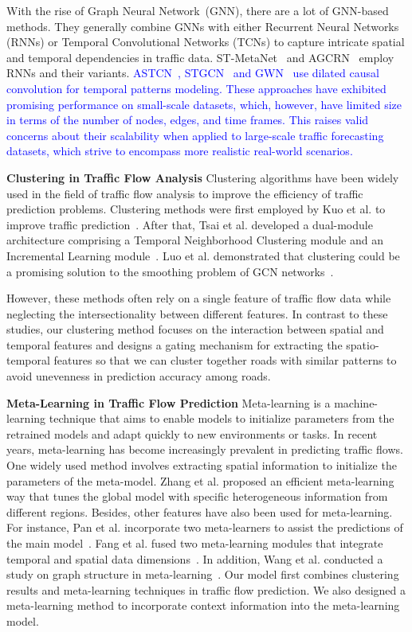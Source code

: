 \documentclass[lettersize,journal]{IEEEtran}
\begin{document}
With the rise of Graph Neural Network~(GNN), there are a lot of GNN-based methods. They generally combine GNNs with either Recurrent Neural Networks (RNNs) or Temporal Convolutional Networks (TCNs) to capture intricate spatial and temporal dependencies in traffic data. ST-MetaNet~\cite{pan_urban_2019} and AGCRN~\cite{10.5555/3495724.3497218} employ RNNs and their variants. \textcolor{blue}{ASTCN~\cite{DBLP:conf/icdm/Zhang0SG021}, STGCN~\cite{stgcn} and GWN~\cite{graphwave} use dilated causal convolution for temporal patterns modeling. These approaches have exhibited promising performance on small-scale datasets, which, however, have limited size in terms of the number of nodes, edges, and time frames. This raises valid concerns about their scalability when applied to large-scale traffic forecasting datasets, which strive to encompass more realistic real-world scenarios.}

\textbf{Clustering in Traffic Flow Analysis}
Clustering algorithms have been widely used in the field of traffic flow analysis to improve the efficiency of traffic prediction problems. Clustering methods were first employed by Kuo et al. to improve traffic prediction~\cite{kuo_adaptive_2001}. After that, Tsai et al. developed a dual-module architecture comprising a Temporal Neighborhood Clustering module and an Incremental Learning module~\cite{tsai_incremental_2022}. Luo et al. demonstrated that clustering could be a promising solution to the smoothing problem of GCN networks~\cite{luo_clusterst_2023}.

However, these methods often rely on a single feature of traffic flow data while neglecting the intersectionality between different features. In contrast to these studies, our clustering method focuses on the interaction between spatial and temporal features and designs a gating mechanism for extracting the spatio-temporal features so that we can cluster together roads with similar patterns to avoid unevenness in prediction accuracy among roads.

\textbf{Meta-Learning in Traffic Flow Prediction}
Meta-learning is a machine-learning technique that aims to enable models to initialize parameters from the retrained models and adapt quickly to new environments or tasks. In recent years, meta-learning has become increasingly prevalent in predicting traffic flows. One widely used method involves extracting spatial information to initialize the parameters of the meta-model. Zhang et al. proposed an efficient meta-learning way that tunes the global model with specific heterogeneous information from different regions\cite{zhang_efficient_2022}. Besides, other features have also been used for meta-learning. For instance, Pan et al. incorporate two meta-learners to assist the predictions of the main model~\cite{pan_urban_2019}. Fang et al. fused two meta-learning modules that integrate temporal and spatial data dimensions~\cite{fang_meta-msnet_2021}. In addition, Wang et al. conducted a study on graph structure in meta-learning~\cite{wang_deep_2022}. Our model first combines clustering results and meta-learning techniques in traffic flow prediction. We also designed a meta-learning method to incorporate context information into the meta-learning model.
\end{document}
